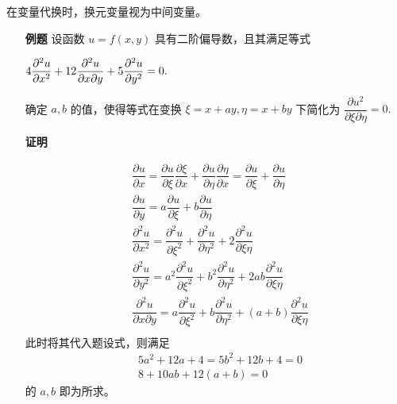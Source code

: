 在变量代换时，换元变量视为中间变量。

\begin{itemize}
    \item[\textbf{例题}] 设函数 $ u = f(x,y) $ 具有二阶偏导数，且其满足等式
    
    $ \displaystyle 4\dfrac{\partial^2 u}{\partial x^2}+12\dfrac{\partial^2 u}{\partial x\partial y}+
    5\dfrac{\partial^2 u}{\partial y^2} = 0. $
    
    确定 $ a,b $ 的值，使得等式在变换 $ \xi = x + ay, \eta = x + by $ 下简化为
    $ \dfrac{\partial u^2}{\partial \xi \partial \eta} = 0. $ 
    \item[\textbf{证明}]
    
    \begin{equation*}
        \begin{aligned}
            &\dfrac{\partial u}{\partial x} = 
            \dfrac{\partial u}{\partial \xi}\dfrac{\partial \xi}{\partial x} + 
            \dfrac{\partial u}{\partial \eta}\dfrac{\partial \eta}{\partial x} = 
            \dfrac{\partial u}{\partial \xi} + \dfrac{\partial u}{\partial \eta} \\
            &\dfrac{\partial u}{\partial y} = 
            a\dfrac{\partial u}{\partial \xi} + b\dfrac{\partial u}{\partial \eta} \\
            &\dfrac{\partial^2 u}{\partial x^2} = 
            \dfrac{\partial^2 u}{\partial \xi^2} + 
            \dfrac{\partial^2 u}{\partial \eta^2} +
            2\dfrac{\partial^2 u}{\partial \xi\eta} \\
            &\dfrac{\partial^2 u}{\partial y^2} = 
            a^2\dfrac{\partial^2 u}{\partial \xi^2} + 
            b^2\dfrac{\partial^2 u}{\partial \eta^2} +
            2ab\dfrac{\partial^2 u}{\partial \xi\eta} \\
            &\dfrac{\partial^2 u}{\partial x\partial y} = 
            a\dfrac{\partial^2 u}{\partial \xi^2} + 
            b\dfrac{\partial^2 u}{\partial \eta^2} +
            (a+b)\dfrac{\partial^2 u}{\partial \xi\eta} \\
        \end{aligned}
    \end{equation*}
    此时将其代入题设式，则满足
    \begin{equation*}
        \begin{aligned}
            &5a^2 + 12a + 4 = 5b^2 + 12b + 4 = 0\\ 
            &8 + 10ab + 12(a+b) = 0
        \end{aligned}
    \end{equation*}
    的 $ a,b $ 即为所求。
\end{itemize}

